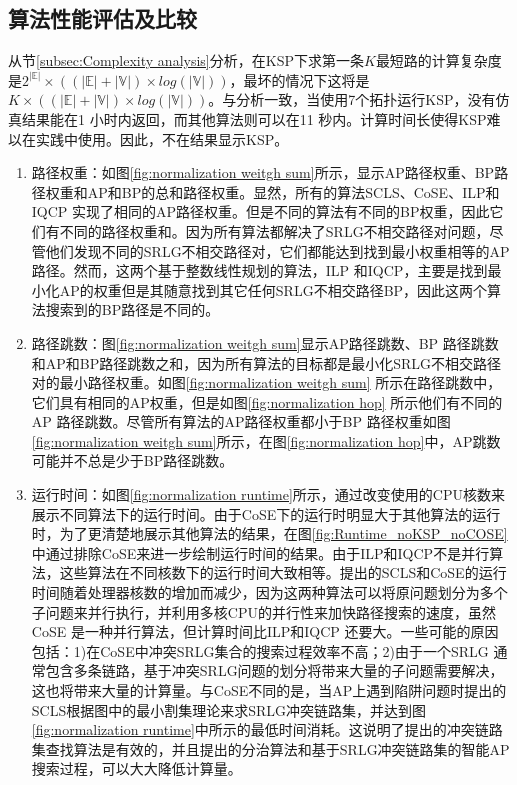 \subsection{算法性能评估及比较}
从节\ref{subsec:Complexity analysis}分析，在KSP下求第一条$K$最短路的计算复杂度是$2^{|\mathbb{E}|}\times ((|\mathbb{E}|+|\mathbb{V}|)\times log(|\mathbb{V}|))$，最坏的情况下这将是$K\times ((|\mathbb{E}|+|\mathbb{V}|)\times log(|\mathbb{V}|))$。与分析一致，当使用7个拓扑运行KSP，没有仿真结果能在1 小时内返回，而其他算法则可以在11 秒内。计算时间长使得KSP难以在实践中使用。因此，不在结果显示KSP。
\begin{enumerate}
  \item 路径权重：如图\ref{fig:normalization weitgh sum}所示，显示AP路径权重、BP路径权重和AP和BP的总和路径权重。显然，所有的算法SCLS、CoSE、ILP和IQCP 实现了相同的AP路径权重。但是不同的算法有不同的BP权重，因此它们有不同的路径权重和。因为所有算法都解决了SRLG不相交路径对问题，尽管他们发现不同的SRLG不相交路径对，它们都能达到找到最小权重相等的AP路径。然而，这两个基于整数线性规划的算法，ILP 和IQCP，主要是找到最小化AP的权重但是其随意找到其它任何SRLG不相交路径BP，因此这两个算法搜索到的BP路径是不同的。
  \item 路径跳数：图\ref{fig:normalization weitgh sum}显示AP路径跳数、BP 路径跳数和AP和BP路径跳数之和，因为所有算法的目标都是最小化SRLG不相交路径对的最小路径权重。如图\ref{fig:normalization weitgh sum} 所示在路径跳数中，它们具有相同的AP权重，但是如图\ref{fig:normalization hop} 所示他们有不同的AP 路径跳数。尽管所有算法的AP路径权重都小于BP 路径权重如图\ref{fig:normalization weitgh sum}所示，在图\ref{fig:normalization hop}中，AP跳数可能并不总是少于BP路径跳数。
  \item 运行时间：如图\ref{fig:normalization runtime}所示，通过改变使用的CPU核数来展示不同算法下的运行时间。由于CoSE下的运行时明显大于其他算法的运行时，为了更清楚地展示其他算法的结果，在图\ref{fig:Runtime_noKSP_noCOSE} 中通过排除CoSE来进一步绘制运行时间的结果。由于ILP和IQCP不是并行算法，这些算法在不同核数下的运行时间大致相等。提出的SCLS和CoSE的运行时间随着处理器核数的增加而减少，因为这两种算法可以将原问题划分为多个子问题来并行执行，并利用多核CPU的并行性来加快路径搜索的速度，虽然CoSE 是一种并行算法，但计算时间比ILP和IQCP 还要大。一些可能的原因包括：1)在CoSE中冲突SRLG集合的搜索过程效率不高；2)由于一个SRLG 通常包含多条链路，基于冲突SRLG问题的划分将带来大量的子问题需要解决，这也将带来大量的计算量。与CoSE不同的是，当AP上遇到陷阱问题时提出的SCLS根据图中的最小割集理论来求SRLG冲突链路集，并达到图\ref{fig:normalization runtime}中所示的最低时间消耗。这说明了提出的冲突链路集查找算法是有效的，并且提出的分治算法和基于SRLG冲突链路集的智能AP搜索过程，可以大大降低计算量。

\end{enumerate}
